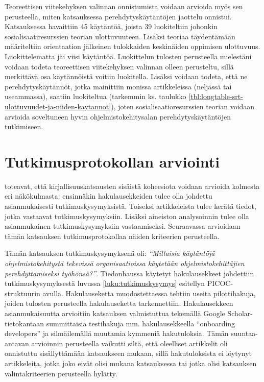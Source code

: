 \documentclass[utf8]{gradu3}
\begin{document}
Teoreettisen viitekehyksen valinnan onnistumista voidaan arvioida myös sen perusteella, miten katsauksessa perehdytyskäytäntöjen jaottelu onnistui. Katsauksessa havaittiin 45 käytäntöä, joista 39 luokiteltiin johonkin sosialisaatiresurssien teorian \parencite{saks-gruman-2012} ulottuvuuteen. Lisäksi teoriaa täydentämään määriteltiin orientaation jälkeinen tulokkaiden keskinäiden oppimisen ulottuvuus. Luokittelematta jäi viisi käytäntöä. Luokittelun tulosten perusteella mielestäni voidaan todeta teoreettisen viitekehyksen valinnan olleen perusteltu, sillä merkittävä osa käytännöistä voitiin luokitella. Lisäksi voidaan todeta, että ne perehdytyskäytännöt, jotka mainittiin monissa artikkeleissa (neljässä tai useammassa), saatiin luokiteltua (tarkemmin ks. taulukko \ref{tbl:longtable-srt-ulottuvuudet-ja-niiden-kaytannot}), joten sosialisaatioresurssien teorian voidaan arvioida soveltuneen hyvin ohjelmistokehitysalan perehdytyskäytäntöjen tutkimiseen.

\section{Tutkimusprotokollan arviointi}
\label{luku-tutkimusprotokollan-arviointi}

\textcite{kitchenham-charters-2007} toteavat, että kirjallisuuskatsausten sisäistä koheesiota voidaan arvioida kolmesta eri näkökulmasta: ensinnäkin hakulausekkeiden tulee olla johdettu asianmukaisesti tutkimuskysymyksistä. Toiseksi artikkeleista tulee kerätä tiedot, jotka vastaavat tutkimuskysymyksiin. Lisäksi aineiston analysoinnin tulee olla asianmukainen tutkimuskysymyksiin vastaamiseksi. Seuraavassa arvioidaan tämän katsauksen tutkimusprotokollaa näiden kriteerien perusteella.

Tämän katsauksen tutkimuskysymyksenä oli: \textit{“Millaisia käytäntöjä ohjelmistokehitystä tekevissä organisaatioissa käytetään ohjelmistokehittäjien perehdyttämiseksi työhönsä?”}. Tiedonhaussa käytetyt hakulausekkeet johdettiin tutkimuskysymyksestä luvussa \ref{luku:tutkimuskysymys} esitellyn PICOC-struktuurin avulla. Hakulauseketta muodostettaessa tehtiin useita pilottihakuja, joiden tulosten perusteella hakulauseketta tarkennettiin. Hakulausekkeen asianmukaisuutta arvioitiin katsauksen valmistuttua tekemällä Google Scholar-tietokantaan summittaisia testihakuja mm. hakulausekkeella “onboarding developers” ja silmäilemällä muutamia kymmeniä hakutuloksia. Tämän suuntaa-antavan arvioinnin perusteella vaikutti siltä, että oleelliset artikkelit oli onnistuttu sisällyttämään katsaukseen mukaan, sillä hakutuloksista ei löytynyt artikkeleita, jotka joko eivät olisi mukana katsauksessa tai jotka olisi katsauksen valintakriteerien perusteella hylätty. 
\end{document}
